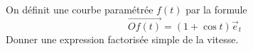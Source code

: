  On d\'efinit une courbe param\'etr\'ee $f(t)$ par la formule
\begin{displaymath}
 \overrightarrow{Of(t)}=(1+\cos t)\overrightarrow{e}_t
\end{displaymath}
Donner une expression factoris\'ee simple de la vitesse. \bigskip